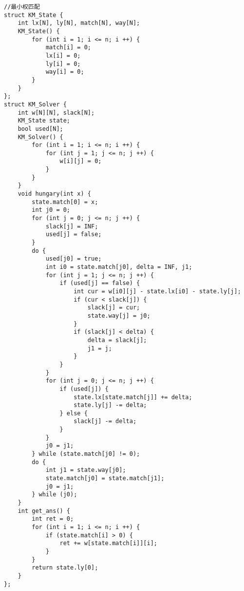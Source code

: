 \begin{lstlisting}
//最小权匹配
struct KM_State {
	int lx[N], ly[N], match[N], way[N];
	KM_State() {
		for (int i = 1; i <= n; i ++) {
			match[i] = 0;
			lx[i] = 0;
			ly[i] = 0;
			way[i] = 0;
		}
	}
};
struct KM_Solver {
	int w[N][N], slack[N];
	KM_State state; 
	bool used[N];
	KM_Solver() {
		for (int i = 1; i <= n; i ++) {
			for (int j = 1; j <= n; j ++) {
				w[i][j] = 0;
			}
		}
	}
	void hungary(int x) {
		state.match[0] = x;
		int j0 = 0;
		for (int j = 0; j <= n; j ++) {
			slack[j] = INF;
			used[j] = false;
		}
		do {
			used[j0] = true;
			int i0 = state.match[j0], delta = INF, j1;
			for (int j = 1; j <= n; j ++) {
				if (used[j] == false) {
					int cur = w[i0][j] - state.lx[i0] - state.ly[j];
					if (cur < slack[j]) {
						slack[j] = cur;
						state.way[j] = j0;
					}
					if (slack[j] < delta) {
						delta = slack[j];
						j1 = j;
					}
				}
			}
			for (int j = 0; j <= n; j ++) {
				if (used[j]) {
					state.lx[state.match[j]] += delta;
					state.ly[j] -= delta;
				} else {
					slack[j] -= delta;
				}
			}
			j0 = j1;
		} while (state.match[j0] != 0);
		do {
			int j1 = state.way[j0];
			state.match[j0] = state.match[j1];
			j0 = j1;
		} while (j0);
	}
	int get_ans() {
		int ret = 0;
		for (int i = 1; i <= n; i ++) {
			if (state.match[i] > 0) {
				ret += w[state.match[i]][i];
			}
		}
		return state.ly[0];
	}
};
\end{lstlisting}
